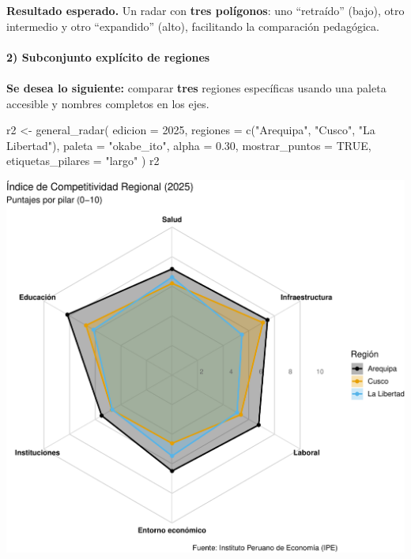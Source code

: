 \documentclass[
  11pt,
  letterpaper,
  DIV=11,
  numbers=noendperiod]{scrartcl}
\makeatletter
\let\oldparagraph\paragraph
\renewcommand{\paragraph}{
    \@ifstar
      \xxxParagraphStar
      \xxxParagraphNoStar
  }
\newcommand{\xxxParagraphStar}[1]{\oldparagraph*{#1}\mbox{}}
\newcommand{\xxxParagraphNoStar}[1]{\oldparagraph{#1}\mbox{}}
\newenvironment{Shaded}{\begin{snugshade}}{\end{snugshade}}
\newcommand{\AttributeTok}[1]{\textcolor[rgb]{0.40,0.45,0.13}{#1}}
\newcommand{\ConstantTok}[1]{\textcolor[rgb]{0.56,0.35,0.01}{#1}}
\newcommand{\DecValTok}[1]{\textcolor[rgb]{0.68,0.00,0.00}{#1}}
\newcommand{\FloatTok}[1]{\textcolor[rgb]{0.68,0.00,0.00}{#1}}
\newcommand{\FunctionTok}[1]{\textcolor[rgb]{0.28,0.35,0.67}{#1}}
\newcommand{\NormalTok}[1]{\textcolor[rgb]{0.00,0.23,0.31}{#1}}
\newcommand{\OtherTok}[1]{\textcolor[rgb]{0.00,0.23,0.31}{#1}}
\newcommand{\StringTok}[1]{\textcolor[rgb]{0.13,0.47,0.30}{#1}}
\makeatother
\begin{document}
\textbf{Resultado esperado.} Un radar con \textbf{tres polígonos}: uno
``retraído'' (bajo), otro intermedio y otro ``expandido'' (alto),
facilitando la comparación pedagógica.

\paragraph{\texorpdfstring{\textbf{2) Subconjunto explícito de
regiones}}{2) Subconjunto explícito de regiones}}\label{subconjunto-expluxedcito-de-regiones}

\paragraph{\texorpdfstring{\textbf{Se desea lo siguiente:} comparar
\textbf{tres} regiones específicas usando una paleta accesible y nombres
completos en los
ejes.}{Se desea lo siguiente: comparar tres regiones específicas usando una paleta accesible y nombres completos en los ejes.}}\label{se-desea-lo-siguiente-comparar-tres-regiones-especuxedficas-usando-una-paleta-accesible-y-nombres-completos-en-los-ejes.}

\begin{Shaded}
\begin{Highlighting}[]
\NormalTok{r2 }\OtherTok{\textless{}{-}} \FunctionTok{general\_radar}\NormalTok{(}
  \AttributeTok{edicion  =} \DecValTok{2025}\NormalTok{,}
  \AttributeTok{regiones =} \FunctionTok{c}\NormalTok{(}\StringTok{"Arequipa"}\NormalTok{, }\StringTok{"Cusco"}\NormalTok{, }\StringTok{"La Libertad"}\NormalTok{),}
  \AttributeTok{paleta   =} \StringTok{"okabe\_ito"}\NormalTok{,}
  \AttributeTok{alpha    =} \FloatTok{0.30}\NormalTok{,}
  \AttributeTok{mostrar\_puntos    =} \ConstantTok{TRUE}\NormalTok{,}
  \AttributeTok{etiquetas\_pilares =} \StringTok{"largo"}
\NormalTok{)}
\NormalTok{r2}
\end{Highlighting}
\end{Shaded}

\includegraphics{Manual_files/figure-pdf/unnamed-chunk-53-1.pdf}
\end{document}
